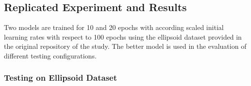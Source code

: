 \documentclass[journal, onecolumn, 11pt]{IEEEtran}
\begin{document}
\clearpage

\subsection{Replicated Experiment and Results}

Two models are trained for 10 and 20 epochs with according scaled initial learning rates with respect to 100 epochs using the ellipsoid dataset provided in the original repository of the study. The better model is used in the evaluation of different testing configurations. 

\subsubsection{Testing on Ellipsoid Dataset}




\clearpage
\printbibliography
\end{document}
